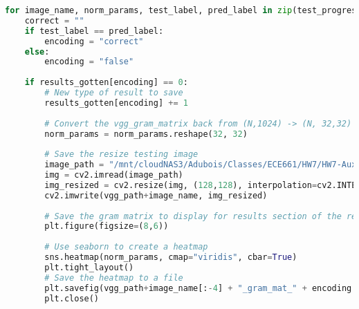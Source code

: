 \documentclass{article}
\begin{document}
\begin{lstlisting}[language=Python]
for image_name, norm_params, test_label, pred_label in zip(test_progress_bar, test_resnet_fine_norm_params, test_labels_list, resnet_fine_norm_predicted_labels):
    correct = ""
    if test_label == pred_label:
        encoding = "correct"
    else:
        encoding = "false"
    
    if results_gotten[encoding] == 0:
        # New type of result to save
        results_gotten[encoding] += 1
        
        # Convert the vgg_gram_matrix back from (N,1024) -> (N, 32,32) for display
        norm_params = norm_params.reshape(32, 32)
        
        # Save the resize testing image
        image_path = "/mnt/cloudNAS3/Adubois/Classes/ECE661/HW7/HW7-Auxilliary/data/testing/" + image_name
        img = cv2.imread(image_path)
        img_resized = cv2.resize(img, (128,128), interpolation=cv2.INTER_AREA)
        cv2.imwrite(vgg_path+image_name, img_resized)
        
        # Save the gram matrix to display for results section of the report
        plt.figure(figsize=(8,6))
        
        # Use seaborn to create a heatmap
        sns.heatmap(norm_params, cmap="viridis", cbar=True)
        plt.tight_layout()
        # Save the heatmap to a file
        plt.savefig(vgg_path+image_name[:-4] + "_gram_mat_" + encoding + ".png", format='png', dpi=300, bbox_inches="tight")
        plt.close()
        
\end{lstlisting}
\end{document}
